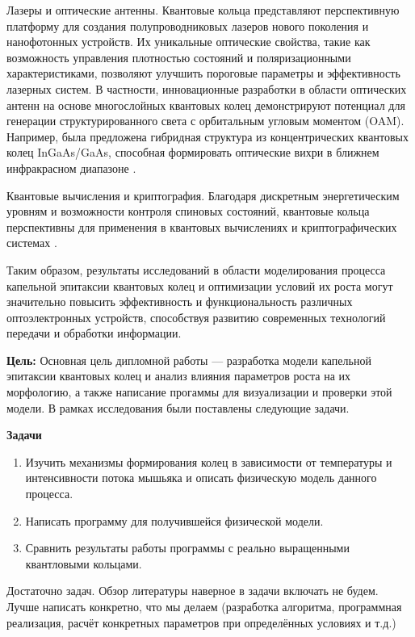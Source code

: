\documentclass[14pt,oneside]{extarticle}
\begin{document}
Лазеры и оптические антенны. Квантовые кольца представляют перспективную платформу для создания полупроводниковых лазеров нового поколения и нанофотонных устройств. Их уникальные оптические свойства, такие как возможность управления плотностью состояний и поляризационными характеристиками, позволяют улучшить пороговые параметры и эффективность лазерных систем. В частности, инновационные разработки в области оптических антенн на основе многослойных квантовых колец демонстрируют потенциал для генерации структурированного света с орбитальным угловым моментом (OAM). Например, была предложена гибридная структура из концентрических квантовых колец InGaAs/GaAs, способная формировать оптические вихри в ближнем инфракрасном диапазоне \cite{Zhang1}.

Квантовые вычисления и криптография. Благодаря дискретным энергетическим уровням и возможности контроля спиновых состояний, квантовые кольца перспективны для применения в квантовых вычислениях и криптографических системах \cite{Alfieri1}. 

Таким образом, результаты исследований в области моделирования процесса капельной эпитаксии квантовых колец и оптимизации условий их роста могут значительно повысить эффективность и функциональность различных оптоэлектронных устройств, способствуя развитию современных технологий передачи и обработки информации.

\label{Tasks}

\textbf{Цель:} Основная цель дипломной работы — разработка модели капельной эпитаксии квантовых колец и анализ влияния параметров роста на их морфологию, а также написание прогаммы для визуализации и проверки этой модели. В рамках исследования были поставлены следующие задачи.

\textbf{Задачи}
\begin{enumerate}
    \item Изучить механизмы формирования колец в зависимости от температуры и интенсивности потока мышьяка и описать физическую модель данного процесса.
    \item Написать программу для получившейся физической модели.
    \item Сравнить результаты работы программы с реально выращенными квантловыми кольцами.
\end{enumerate}

Достаточно задач. Обзор литературы наверное в задачи включать не будем. Лучше написать конкретно, что мы делаем (разработка алгоритма, программная реализация, расчёт конкретных параметров при определённых условиях и т.д.)
\end{document}
